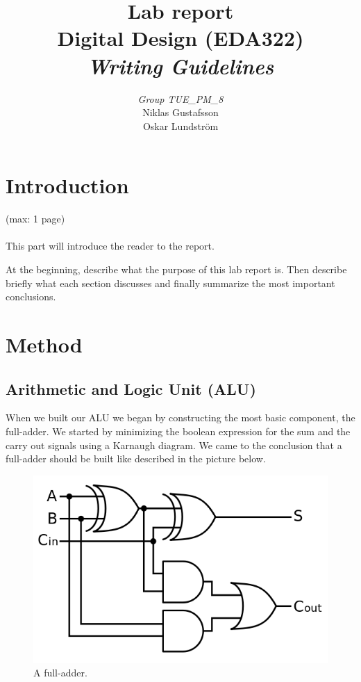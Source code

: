 \documentclass[a4paper,11pt]{article}
\begin{document}
\pagestyle{empty}
\begin{titlepage}

\title{\Huge{Lab report} \\[0.1cm] \Large{Digital Design (EDA322)} \\ [0.4cm] \Large{ \emph{Writing Guidelines}} \\[0.4cm]}
\author{\large{\emph{Group TUE\_PM\_8}} \\[0.2cm] Niklas Gustafsson \\[0.05cm] Oskar Lundström \\[0.1cm]}
\maketitle
\thispagestyle{empty}
\end{titlepage}
\clearpage
\pagestyle{fancyplain}
\tableofcontents
\clearpage
\setcounter{page}{1}
\section{Introduction}
(max: 1 page)
\\\\
This part will introduce the reader to the report. 

At the beginning, describe what the purpose of this lab report is. Then describe briefly what each section discusses and finally summarize the most important conclusions. 

\newpage
\section{Method}
\subsection{Arithmetic and Logic Unit (ALU)}

When we built our ALU we began by constructing the most basic component, the full-adder. We started by minimizing the boolean expression for the sum and the carry out signals using a Karnaugh diagram. We came to the conclusion that a full-adder should be built like described in the picture below.

\begin{figure}[h!]
  \centering
  \includegraphics[width=0.5\linewidth]{fulladder.png}
  \caption{A full-adder.}
  \label{fig:etikett}
\end{figure}
\end{document}
